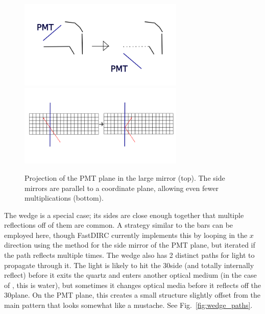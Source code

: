\begin{figure}[!h]
\centering
\includegraphics[width=0.7\textwidth]{pics/large_planar_pmt_project.png}
\includegraphics[width=0.7\textwidth]{pics/sidemirror_pmt_reflection.png}
\caption{Projection of the PMT plane in the large mirror (top).  The side mirrors are parallel to a coordinate plane, allowing even fewer multiplications (bottom).}
\label{fig:optical_box_optimize}
\end{figure}

The wedge is a special case; its sides are close enough together that multiple reflections off of them are common.  A strategy similar to the bars can be employed here, though FastDIRC currently implements this by looping in the $x$ direction using the method for the side mirror of the PMT plane, but iterated if the path reflects multiple times.  The wedge also has 2 distinct paths for light to propagate through it.  The light is likely to hit the 30\mydeg side (and totally internally reflect) before it exits the quartz and enters another optical medium (in the case of \gluex, this is water), but sometimes it changes optical media before it reflects off the 30\mydeg plane.  On the PMT plane, this creates a small structure slightly offset from the main pattern that looks somewhat like a mustache.  See Fig.~\ref{fig:wedge_paths}.

